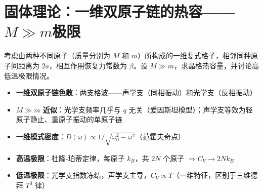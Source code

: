 \section{固体理论：一维双原子链的热容——$M\gg m$极限}
\label{sec:1d-diatomic-heat-capacity}

\begin{modelbox}[题目：一维复式格子的晶格热容量]
考虑由两种不同原子（质量分别为 $M$ 和 $m$）所构成的一维复式格子，相邻同种原子间距离为 $2a$，相互作用恢复力常数为 $\beta$。设 $M\gg m$，求晶格热容量，并讨论高低温极限情况。
\end{modelbox}

\begin{tipbox}[考点快速分析]
\begin{itemize}
    \item \textbf{一维双原子链色散}：两支格波——声学支（同相振动）和光学支（反相振动）
    \item \textbf{$M\gg m$ 近似}：光学支频率几乎与 $q$ 无关（爱因斯坦模型）；声学支等效为轻原子静止、重原子振动的单原子链
    \item \textbf{一维模式密度}：$D(\omega)\propto 1/\sqrt{\omega_0^2-\omega^2}$（范霍夫奇点）
    \item \textbf{高温极限}：杜隆-珀蒂定律，每原子 $k_B$，共 $2N$ 个原子 $\Rightarrow C_V\to2Nk_B$
    \item \textbf{低温极限}：光学支指数冻结，声学支主导，$C_V\propto T$（一维特征，区别于三维德拜 $T^3$ 律）
\end{itemize}
\end{tipbox}

